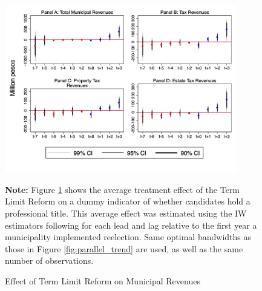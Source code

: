 \documentclass[12pt]{amsart}
\numberwithin{equation}{section}
\theoremstyle{definition}
\theoremstyle{definition}
\theoremstyle{definition}
\begin{document}
	
\begin{figure}[h]   
\centering
 \caption{Effect of Term Limit Reform on Municipal Revenues}
 \label{fig:revenues1}
\includegraphics[width=0.9\textwidth]{../Figures/revenues_allyears1.png}
       \captionsetup{justification=centering}
         
 \textbf{Note:} Figure \ref{fig:revenues1} shows the average treatment effect of the Term Limit Reform on a dummy indicator of whether candidates hold a professional title. This average effect was estimated using the IW estimators following \citet{abraham_sun_2020} for each lead and lag relative to the first year a municipality implemented reelection. Same optimal bandwidths as those in Figure \ref{fig:parallel_trend} are used, as well as the same number of observations.  
       
\end{figure}   
\end{document}
